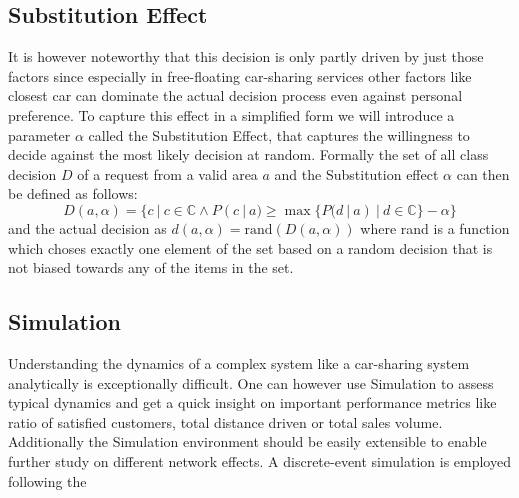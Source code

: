 \subsection{Substitution Effect}
\label{sub_sec:Method/Substitution}

It is however noteworthy that this decision is only
partly driven by just those factors since especially in free-floating car-sharing services
other factors like closest car can dominate the actual decision process even against personal
preference. To capture this effect in a simplified form we will introduce a parameter $\alpha$
called the Substitution Effect, that captures the willingness to decide against the most likely
decision at random. Formally the set of all class decision $D$ of a request from a valid area $a$ and the 
Substitution effect $\alpha$ can then be defined as follows:
$$
  D(a, \alpha) = \{ c \ | \ c \in \mathbb{C} \land P(c \ | \ a) \ge \max\{ P(d \ | \ a) \ | \ d \in \mathbb{C} \} - \alpha \}
$$
and the actual decision as $d(a, \alpha) = \text{rand}(D(a, \alpha))$
where rand is a function which choses exactly one element of the set based on a random decision that
is not biased towards any of the items in the set. 

\subsection{Simulation}
\label{sub_sec:Method/Simulation}

Understanding the dynamics of a complex system like a car-sharing system analytically is exceptionally difficult.
One can however use Simulation to assess typical dynamics and get a quick insight on important performance metrics
like ratio of satisfied customers, total distance driven or total sales volume. Additionally the Simulation
environment should be easily extensible to enable further study on different network effects. A discrete-event
simulation is employed following the 

